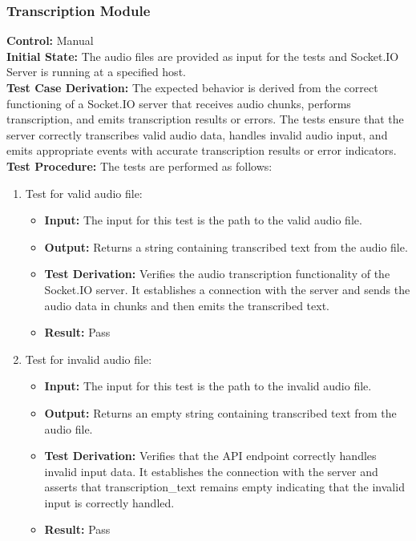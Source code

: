 \documentclass[12pt, titlepage]{article}
\begin{document}
  \subsubsection{Transcription Module}

  \textbf{Control:} Manual\\
  \textbf{Initial State:} The audio files are provided as input for the tests and Socket.IO Server is running at a specified host.\\
  \textbf{Test Case Derivation:} The expected behavior is derived from the correct functioning of a Socket.IO server that receives audio chunks, performs transcription, and emits transcription results or errors. The tests ensure that the server correctly transcribes valid audio data, handles invalid audio input, and emits appropriate events with accurate transcription results or error indicators.\\
  \textbf{Test Procedure:} The tests are performed as follows:\\

  \begin{enumerate}
    \item Test for valid audio file:
      \begin{itemize}
        \item \textbf{Input:} The input for this test is the path to the valid audio file.   
        \item \textbf{Output:} Returns a string containing transcribed text from the audio file.
        \item \textbf{Test Derivation:} Verifies the audio transcription functionality of the Socket.IO server. It establishes a connection with the server and sends the audio data in chunks and then emits the transcribed text. 
        \item \textbf{Result:} Pass
      \end{itemize}

    \item Test for invalid audio file:
      \begin{itemize}
        \item \textbf{Input:} The input for this test is the path to the invalid audio file. 
        \item \textbf{Output:} Returns an empty string containing transcribed text from the audio file.  
        \item \textbf{Test Derivation:} Verifies that the API endpoint correctly handles invalid input data. It establishes the connection with the server and asserts that transcription_text remains empty indicating that the invalid input is correctly handled.
        \item \textbf{Result:} Pass
      \end{itemize}
  \end{enumerate}
\end{document}
